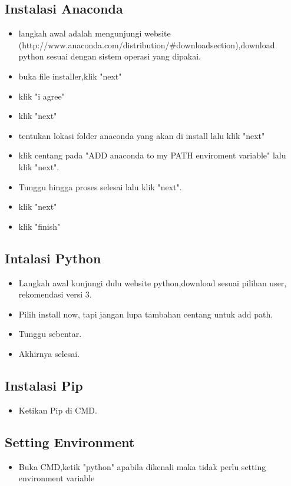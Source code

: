 \documentclass{article}
\begin{document}
\subsection {Instalasi Anaconda}
\begin{itemize}
    \item langkah awal adalah mengunjungi website (http://www.anaconda.com/distribution/#downloadsection),download python sesuai dengan sistem operasi yang dipakai.
    \item buka file installer,klik "next"
    \item klik "i agree"
    \item klik "next"
    \item tentukan lokasi folder anaconda yang akan di install lalu klik "next"
    \item klik centang pada "ADD anaconda to my PATH enviroment variable" lalu klik "next".
    \item Tunggu hingga proses selesai lalu klik "next".
    \item klik "next"
    \item klik "finish"
\end{itemize}
\subsection {Intalasi Python}
\begin{itemize}
    \item Langkah awal kunjungi dulu website python,download sesuai pilihan user, rekomendasi versi 3.
    \item Pilih install now, tapi jangan lupa tambahan centang untuk add path.
    \item Tunggu sebentar.
    \item Akhirnya selesai.
\end{itemize}
\subsection {Instalasi Pip}
\begin{itemize}
    \item Ketikan Pip di CMD.
\end{itemize}
\subsection{Setting Environment}
\begin{itemize}
    \item Buka CMD,ketik "python" apabila dikenali maka tidak perlu setting environment variable
\end{itemize}
\end{document}

